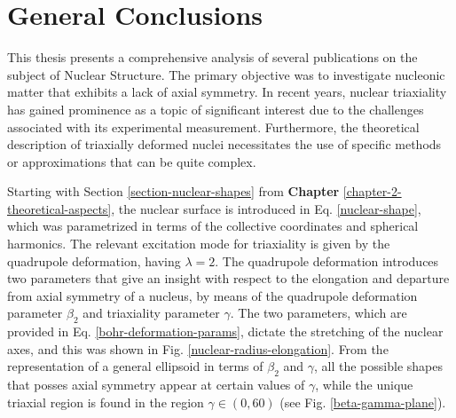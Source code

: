 \chapter{General Conclusions}
\label{chapter-8-conclusions}

This thesis presents a comprehensive analysis of several publications on the subject of Nuclear Structure. The primary objective was to investigate nucleonic matter that exhibits a lack of axial symmetry. In recent years, nuclear triaxiality has gained prominence as a topic of significant interest due to the challenges associated with its experimental measurement. Furthermore, the theoretical description of triaxially deformed nuclei necessitates the use of specific methods or approximations that can be quite complex.


Starting with Section \ref{section-nuclear-shapes} from \textbf{Chapter} \ref{chapter-2-theoretical-aspects}, the nuclear surface is introduced in Eq. \eqref{nuclear-shape}, which was parametrized in terms of the collective coordinates and spherical harmonics. The relevant excitation mode for triaxiality is given by the quadrupole deformation, having $\lambda=2$. The quadrupole deformation introduces two parameters that give an insight with respect to the elongation and departure from axial symmetry of a nucleus, by means of the quadrupole deformation parameter $\beta_2$ and triaxiality parameter $\gamma$. The two parameters, which are provided in Eq. \eqref{bohr-deformation-params}, dictate the stretching of the nuclear axes, and this was shown in Fig. \ref{nuclear-radius-elongation}. From the representation of a general ellipsoid in terms of $\beta_2$ and $\gamma$, all the possible shapes that posses axial symmetry appear at certain values of $\gamma$, while the unique triaxial region is found in the region $\gamma\in(0,60)$ (see Fig. \ref{beta-gamma-plane}).

